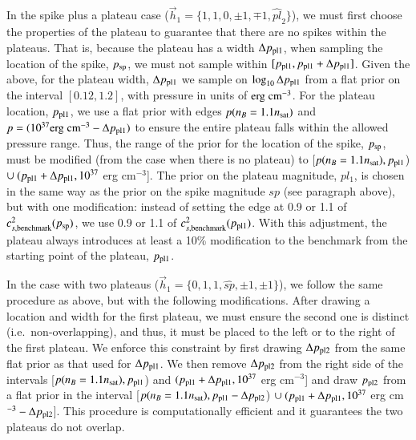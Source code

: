 \documentclass[aps,prd,nofootinbib,tightenlines,notitlepage,floatfix,superscriptaddress,showkeys,twocolumn]{revtex4-1}
\begin{document}
In the spike plus a plateau case ($\vec{h}_1 = \{1,1,0,\pm 1,\mp 1,\widehat{pl}_2\}$), we must first choose the properties of the plateau to guarantee that there are no spikes within the plateaus. That is, because the plateau has a width $\Delta p_{\rm pl1}$, when sampling the location of the spike, $p_{\rm sp}$, we must not sample within $[p_{\rm pl1}, p_{\rm pl1} + \Delta p_{\rm pl1}]$. Given the above, for the plateau width, $\Delta p_{\rm pl1}$ we sample on $\log_{10} \Delta p_{\rm pl1}$ from a flat prior on the interval $[0.12,1.2]$, with pressure in units of ${\rm erg \; cm}^{-3}$. For the plateau location, $p_{\rm pl1}$, we use a flat prior with edges $p(n_B = 1.1 n_{\rm sat})$ and $p = (10^{37} {\rm erg \; cm}^{-3} - \Delta p_{\rm pl1})$ to ensure the entire plateau falls within the allowed pressure range. Thus, the range of the prior for the location of the spike, $p_{\rm sp}$, must be modified (from the case when there is no plateau) to [$p(n_B = 1.1 n_{\rm sat}), p_{\rm pl1}$) $\cup \ (p_{\rm pl1} + \Delta p_{\rm pl1}, 10^{37}$ erg cm$^{-3}$]. The prior on the plateau magnitude, $pl_1$, is chosen in the same way as the prior on the spike magnitude $sp$ (see paragraph above), but with one modification: instead of setting the edge at 0.9 or 1.1 of $c_{s,\rm benchmark}^2(p_{\rm sp})$, we use 0.9 or 1.1 of $c_{s,\rm benchmark}^2(p_{\rm pl1})$. With this adjustment, the plateau always introduces at least a 10\% modification to the benchmark from the starting point of the plateau, $p_{\rm pl1}$.

In the case with two plateaus ($\vec{h}_1 = \{0,1,1,\widehat{sp},\pm 1, \pm 1\}$), we follow the same procedure as above, but with the following modifications. After drawing a location and width for the first plateau, we must ensure the second one is distinct (i.e.~non-overlapping), and thus, it must be placed to the left or to the right of the first plateau. We enforce this constraint by first drawing $\Delta p_{\rm pl2}$ from the same flat prior as that used for $\Delta p_{\rm pl1}$. We then remove $\Delta p_{\rm pl2}$ from the right side of the intervals [$p(n_B = 1.1 n_{\rm sat}), p_{\rm pl1}$) and $(p_{\rm pl1} + \Delta p_{\rm pl1}, 10^{37}$ erg cm$^{-3}$] and draw $p_{\rm pl2}$ from a flat prior in the interval [$p(n_B = 1.1 n_{\rm sat}), p_{\rm pl1}- \Delta p_{\rm pl2}$) $\cup \ (p_{\rm pl1} + \Delta p_{\rm pl1}, 10^{37}$ erg cm$^{-3} - \Delta p_{\rm pl2}$]. This procedure is computationally efficient and it guarantees the two plateaus do not overlap. 
\end{document}
